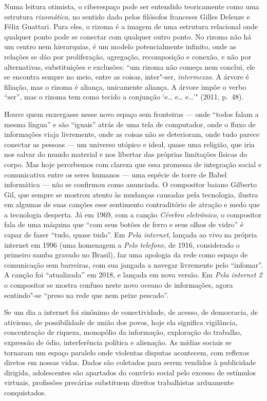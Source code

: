Numa leitura otimista, o ciberespaço pode ser entendido teoricamente
como uma estrutura \emph{rizomática}, no sentido dado pelos filósofos
franceses Gilles Deleuze e Félix Guattari. Para eles, o
rizoma é a imagem de uma estrutura relacional onde qualquer ponto pode
se conectar com qualquer outro ponto. No rizoma não há um centro nem
hierarquias, é um modelo potencialmente infinito, onde as relações se
dão por proliferação, agregação, recomposição e conexão, e não por
alternativas, substituições e exclusões: ``um rizoma não começa nem
conclui, ele se encontra sempre no meio, entre as coisas, inter"-ser,
\emph{intermezzo}. A árvore é filiação, mas o rizoma é aliança,
unicamente aliança. A árvore impõe o verbo ``ser'', mas o rizoma tem
como tecido a conjunção `e\ldots{} e\ldots{} e\ldots{}'" (2011, p.~48).

Houve quem enxergasse nesse novo espaço sem fronteiras --- onde ``todos
falam a mesma língua'' e são ``iguais'' atrás de uma tela de computador,
onde o fluxo de informações viaja livremente, onde as coisas não se
deterioram, onde tudo parece conectar as pessoas --- um universo utópico
e ideal, quase uma religião, que iria nos salvar do mundo material e nos
libertar das próprias limitações físicas do corpo. Mas hoje percebemos
com clareza que essa promessa de integração social e comunicativa entre
os seres humanos --- uma espécie de torre de Babel informática --- não se
confirmou como anunciada. O compositor baiano Gilberto Gil, que sempre
se mostrou atento às mudanças causadas pela tecnologia, ilustra em
algumas de suas canções esse sentimento contraditório de atração e medo
que a tecnologia desperta. Já em 1969, com a canção \emph{Cérebro
eletrônico}, o compositor fala de uma máquina que ``com seus botões de
ferro e seus olhos de vidro'' é capaz de fazer ``tudo, quase tudo''. Em
\emph{Pela internet}, lançada ao vivo na própria internet em 1996 (uma
homenagem a \emph{Pelo telefone}, de 1916, considerado o primeiro samba
gravado no Brasil), faz uma apologia da rede como espaço de comunicação
sem barreiras, com sua jangada a navegar livremente pelo ``infomar''. A
canção foi ``atualizada'' em 2018, e lançada em nova versão. Em
\emph{Pela internet 2} o compositor se mostra confuso neste novo oceano
de informações, agora sentindo"-se ``preso na rede que nem peixe
pescado''.

Se um dia a internet foi sinônimo de conectividade, de acesso, de
democracia, de ativismo, de possibilidade de união dos povos, hoje ela
significa vigilância, concentração de riqueza, monopólio da informação,
exploração do trabalho, expressão de ódio, interferência política e
alienação. As mídias sociais se tornaram um espaço paralelo onde
violentas disputas acontecem, com reflexos diretos em nossas vidas.
Dados são coletados para serem vendidos à publicidade dirigida, adolescentes são apartados do convívio social pelo excesso de estímulos virtuais, profissões precárias substituem direitos trabalhistas arduamente conquistados.

